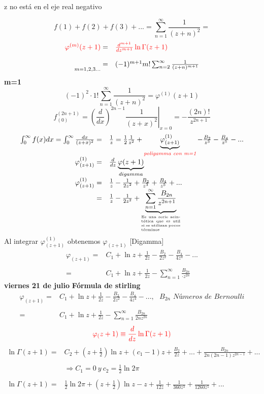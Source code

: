 \documentclass{article}
\theoremstyle{definition}
\begin{document}
\begin{center}
	z no está en el eje real negativo
\end{center}
\[f(1)+f(2)+f(3)+...=\sum^{\infty}_{n=1}\frac{1}{(z+n)^2}=\]
\[
\begin{array}{rl}
	\textcolor{red}{\varphi^{(m)}(z+1)}=&\textcolor{red}{\frac{d^{m+1}}{dz^{m+1}}\ln \Gamma (z+1)}\\
	\\
	\underset{m=1,2,3...}{ }=& (-1)^{m+1}m!\sum^{\infty}_{n=2}\frac{1}{(z+n)^{m+1}}
\end{array}
\]
\textbf{m=1}
\[(-1)^2\cdot 1!\sum^{\infty}_{n=1}\frac{1}{(z+n)^2}=\varphi^{(1)}(z+1)\]
\[f^{(2n+1)}_{(0)}=\left.\left(\frac{d}{dx}\right)^{2n-1}\frac{1}{(z+x)^2}\right|_{x=0}=-\frac{(2n)!}{z^{2n+1}}\]
\[
\begin{array}{rl}
	\int^{\infty}_0f(x)dx=\int^{\infty}_0\frac{dx}{(z+x)^2}=&\frac{1}{z}=\frac{1}{2}\frac{1}{z^2}+\underbrace{\varphi ^{(1)}_{(z+1)}}_{\textcolor{red}{\textit{poligamma con m=1}}}-\frac{B_2}{z^3}-\frac{B_4}{z^5}-...\\
	\varphi ^{(1)}_{(z+1)}=& \frac{d}{dz}\underbrace{\varphi (z+1)}_{digamma}\\
	\varphi ^{(1)}_{(z+1)}=&\frac{1}{z}-\frac{1}{2z^2}+\frac{B_2}{z^3}+\frac{B_4}{z^5}+...\\
	=& \frac{1}{z}-\frac{1}{2z^2}+\underbrace{\sum^{\infty}_{n=1}\frac{B_{2n}}{z^{2n+1}}}_{\parbox{5.5em}{\tiny Es una serie asintótica que es util si se utilizan pocos términos}}
\end{array}\]
Al integrar $\varphi ^{(1)}_{(z+1)}$ obtenemos $\varphi _{(z+1)}$ [Digamma]
\[
\begin{array}{rl}
	\varphi_{(z+1)}=& C_1+\ln z+\frac{1}{2z}-\frac{B_2}{2z^2}-\frac{B_4}{4z^4}-...\\
	\\
	=& C_1+\ln z+\frac{1}{2z}-\sum\limits^{\infty}_{n=1}\frac{B_{2n}}{\cdot z^{2n}}
\end{array}
\]
\newpage
\textbf{viernes 21 de julio}
\textbf{Fórmula de stirling}
\[
\begin{array}{rl}
	\varphi_{(z+1)}=& C_1 +\ln z+ \frac{1}{2z}-\frac{B_2}{2z^2}-\frac{B_4}{4z^4}-...,\ \ \ B_{2n} \textit{ Números de Bernoulli}\\
	\\
	=& C_1 +\ln z+ \frac{1}{2z}-\sum\limits^{\infty}_{n=1}\frac{B_{2n}}{2nz^{2n}}
\end{array}
\]
\[\textcolor{red}{\varphi_(z+1)\equiv \frac{d}{dz} \ln \Gamma (z+1)}\]
\[
\begin{array}{rl}
	\ln \Gamma (z+1) =& C_2 +\left(z+\frac{1}{2}\right) \ln z + (c_1-1)z+\frac{B_2}{2z}+...+ \frac{B_{2n}}{2n(2n-1)z^{2n-1}}+...\\
	\\
	&\Rightarrow C_1=0\ y \ c_2=\frac{1}{2}\ln 2\pi\\
	\\
	\ln \Gamma (z+1) =&\frac{1}{2} \ln 2\pi + \left(z+\frac{1}{2}\right) \ln z -z+\frac{1}{12z}+\frac{1}{360z^3}+\frac{1}{1260z^5}+...\\
\end{array}
\]
\end{document}
